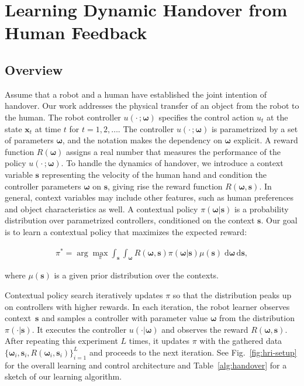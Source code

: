\section{Learning Dynamic Handover from Human Feedback}
\label{sec:handover}
\subsection{Overview}

Assume that a robot and a human have established the joint intention of handover.  Our work addresses the physical transfer of an object from the robot to the human. The robot controller $u(\cdot\, ;  {\boldsymbol{\omega}}  )$ specifies the control action $u_t$ at the state $  {\boldsymbol{x}} _t$ at time $t$ for $t=1, 2, \dots$. The controller $u(\cdot\, ;  {\boldsymbol{\omega}}  )$ is parametrized by a set of parameters $ {\boldsymbol{\omega}} $, and the notation makes the dependency on $ {\boldsymbol{\omega}} $ explicit. A reward function  $R( {\boldsymbol{\omega}} )$ assigns a real number that measures the performance of the policy $u(\cdot\, ;  {\boldsymbol{\omega}}  )$. To handle the dynamics of handover, we introduce a context variable $  {\boldsymbol{s}} $ representing the velocity of the human hand and condition the controller parameters $ {\boldsymbol{\omega}} $ on $  {\boldsymbol{s}} $, giving rise the reward function $R( {\boldsymbol{\omega}} ,   {\boldsymbol{s}} )$. In general, context variables may include other features, such as human preferences and object characteristics as well. A contextual policy $\pi( {\boldsymbol{\omega}}  |   {\boldsymbol{s}} )$ is a probability distribution over parametrized controllers, conditioned on the context $  {\boldsymbol{s}} $. Our goal is to learn a contextual policy that maximizes the expected reward:

\begin{align}
\pi^* = \arg\max_{\pi} \int_{  {\boldsymbol{s}} } \int_{ {\boldsymbol{\omega}} } R( {\boldsymbol{\omega}} ,   {\boldsymbol{s}} ) \pi( {\boldsymbol{\omega}} |  {\boldsymbol{s}} ) \mu(  {\boldsymbol{s}} )\;
\mathrm{d} {\boldsymbol{\omega}}  \,\mathrm{d}  {\boldsymbol{s}} , 
\end{align}

where $\mu(  {\boldsymbol{s}} )$ is a given prior distribution over the contexts.

Contextual policy search iteratively updates $\pi$ so that the distribution peaks up on controllers with higher rewards.  In each iteration, the robot learner observes context~$  {\boldsymbol{s}} $ and samples a controller with parameter value $ {\boldsymbol{\omega}} $ from the distribution $ \pi(\cdot |  {\boldsymbol{s}} )$.  It executes the controller
$u(\cdot |  {\boldsymbol{\omega}} )$ and observes the reward $R( {\boldsymbol{\omega}} ,  {\boldsymbol{s}} )$.  After repeating this experiment $L$ times, it updates $\pi$ with the gathered data
$\{ {\boldsymbol{\omega}} _i,  {\boldsymbol{s}} _i,R( {\boldsymbol{\omega}} _i,  {\boldsymbol{s}} _i)\}_{i=1}^L$ and proceeds to the next iteration. See Fig.~\ref{fig:hri-setup} for the overall learning and control architecture and Table~\ref{alg:handover}
for a sketch of our learning algorithm.

